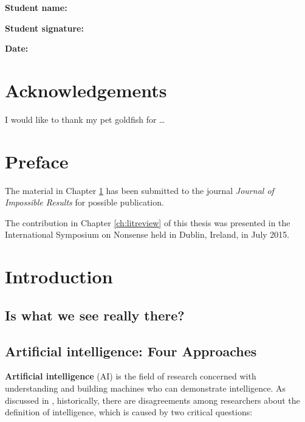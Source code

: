 \documentclass{monashthesis}
\theoremstyle{definition}
\theoremstyle{definition}
\theoremstyle{definition}
\theoremstyle{definition}
\theoremstyle{remark}
\begin{document}
\textbf{Student name:} \authorname

\textbf{Student signature:}

\textbf{Date:}

\hypertarget{acknowledgements}{%
\chapter*{Acknowledgements}\label{acknowledgements}}

I would like to thank my pet goldfish for \dots

\hypertarget{preface}{%
\chapter*{Preface}\label{preface}}

The material in Chapter \ref{ch:intro} has been submitted to the journal \emph{Journal of Impossible Results} for possible publication.

The contribution in Chapter \ref{ch:litreview} of this thesis was presented in the International Symposium on Nonsense held in Dublin, Ireland, in July 2015.

\clearpage{}\setcounter{page}{0}

\hypertarget{ch:intro}{%
\chapter{Introduction}\label{ch:intro}}

\hypertarget{is-what-we-see-really-there}{%
\section{Is what we see really there?}\label{is-what-we-see-really-there}}

\hypertarget{artificial-intelligence-four-approaches}{%
\section{Artificial intelligence: Four Approaches}\label{artificial-intelligence-four-approaches}}

\textbf{Artificial intelligence} (AI) is the field of research concerned with understanding and building machines who can demonstrate intelligence. As discussed in \textcite{russell_artificial_2002}, historically, there are disagreements among researchers about the definition of intelligence, which is caused by two critical questions:
\end{document}
